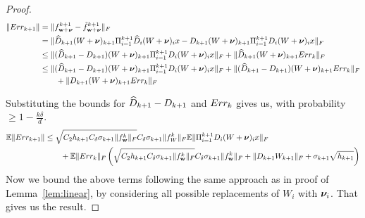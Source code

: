\documentclass{article}
\begin{document}
\begin{proof}

\begin{align*}
\|Err_{k+1} \| &= \|f^{k+1}_{\mathbf{w}+\boldsymbol{\nu}} -\tilde{f}^{k+1}_{\mathbf{w}+\boldsymbol{\nu}}\|_F \\ &= \| \widehat{D}_{k+1}(W+\boldsymbol{\nu})_{k+1} \Pi_{i=1}^{k+1} \widehat{D}_i (W+\boldsymbol{\nu})_i x - D_{k+1}(W+\boldsymbol{\nu})_{k+1} \Pi_{i=1}^{k+1} D_i (W+\boldsymbol{\nu})_i x\|_F \\
&\leq \| (\widehat{D}_{k+1}-D_{k+1})(W+\boldsymbol{\nu})_{k+1} \Pi_{i=1}^{k+1} D_i (W+\boldsymbol{\nu})_i x\|_F + \| \widehat{D}_{k+1} (W+\boldsymbol{\nu})_{k+1} Err_k\|_F \\
&\leq \| (\widehat{D}_{k+1}-D_{k+1})(W+\boldsymbol{\nu})_{k+1} \Pi_{i=1}^{k+1} D_i (W+\boldsymbol{\nu})_i x\|_F + \| (\widehat{D}_{k+1}-D_{k+1}) (W+\boldsymbol{\nu})_{k+1} Err_k\|_F \\ & \quad \quad +\|D_{k+1} (W+\boldsymbol{\nu})_{k+1} Err_k\|_F 
\end{align*}

Substituting the bounds for $\widehat{D}_{k+1} -D_{k+1}$ and $Err_k$ gives us, with probability $\geq 1-\frac{k \delta}{d}$.
\begin{align*}
\mathbb{E} \|Err_{k+1} \| &\leq  \sqrt{C_2 h_{k+1}C_{\delta} \sigma_{k+1} \|f^k_{\mathbf{w}} \|_F } C_{\delta} \sigma_{k+1} \|f^k_{W} \|_F \mathbb{E} \| \Pi_{i=1}^{k+1} D_i (W+\boldsymbol{\nu})_i x\|_F \\
&\quad \quad + \mathbb{E} \|Err_k\|_F \left( \sqrt{C_2 h_{k+1}C_{\delta} \sigma_{k+1} \|f^k_{\mathbf{w}} \|_F } C_{\delta} \sigma_{k+1} \|f^k_{\mathbf{w}} \|_F + \|D_{k+1} W_{k+1}\|_F +\sigma_{k+1}\sqrt{h_{k+1}} \right)
\end{align*}
Now we bound the above terms following the same approach as in proof of Lemma~\ref{lem:linear}, by considering all possible replacements of $W_i$ with $\boldsymbol{\nu}_i$. That gives us the result.



%

\end{proof}
\end{document}
